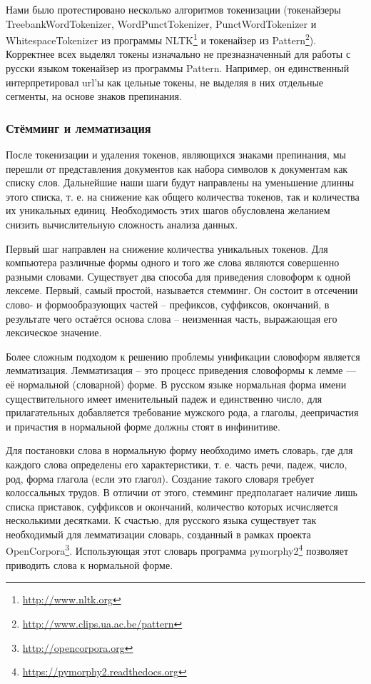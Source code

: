 Нами было протестировано несколько алгоритмов токенизации (токенайзеры TreebankWordTokenizer, WordPunctTokenizer, PunctWordTokenizer и WhitespaceTokenizer из программы NLTK\footnote{\href{http://www.nltk.org}{http://www.nltk.org}} и токенайзер из Pattern\footnote{\href{http://www.clips.ua.ac.be/pattern}{http://www.clips.ua.ac.be/pattern}}). Корректнее всех выделял токены изначально не презназначенный для работы с русски языком токенайзер из программы Pattern. Например, он единственный интерпретировал url'ы как цельные токены, не выделяя в них отдельные сегменты, на основе знаков препинания.

\subsubsection{Стёмминг и лемматизация}
После токенизации и удаления токенов, являющихся знаками препинания, мы перешли от представления документов как набора символов к документам как списку слов. Дальнейшие наши шаги будут направлены на уменьшение длинны этого списка, т. е. на снижение как общего количества токенов, так и количества их уникальных единиц. Необходимость этих шагов обусловлена желанием снизить вычислительную сложность анализа данных.

Первый шаг направлен на снижение количества уникальных токенов. Для компьютера различные формы одного и того же слова являются совершенно разными словами. Существует два способа для приведения словоформ к одной лексеме. Первый, самый простой, называется стемминг. Он состоит в отсечении слово- и формообразующих частей -- префиксов, суффиксов, окончаний, в результате чего остаётся основа слова -- неизменная часть, выражающая его лексическое значение.

Более сложным подходом к решению проблемы унификации словоформ является лемматизация. Лемматизация -- это процесс приведения словоформы к лемме — её нормальной (словарной) форме. В русском языке нормальная форма имени существительного имеет именительный падеж и единственно число, для прилагательных добавляется требование мужского рода, а глаголы, деепричастия и причастия в нормальной форме должны стоят в инфинитиве.

Для постановки слова в нормальную форму необходимо иметь словарь, где для каждого слова определены его характеристики, т. е. часть речи, падеж, число, род, форма глагола (если это глагол). Создание такого словаря требует колоссальных трудов. В отличии от этого, стемминг предполагает наличие лишь списка приставок, суффиксов и окончаний, количество которых исчисляется несколькими десятками. К счастью, для русского языка существует так необходимый для лемматизации словарь, созданный в рамках проекта OpenCorpora\footnote{\href{http://opencorpora.org}{http://opencorpora.org}}. Использующая этот словарь программа pymorphy2\footnote{\href{https://pymorphy2.readthedocs.org}{https://pymorphy2.readthedocs.org}} позволяет приводить слова к нормальной форме.

